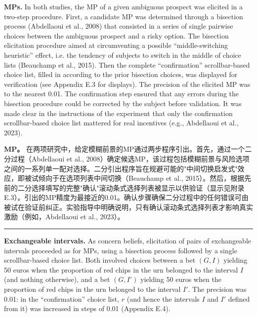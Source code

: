 \documentclass[12pt,a4paper]{article}
\newenvironment{original}
  {\par\vspace{0.5em}\noindent\color{black}\ignorespaces}
  {\par\vspace{0.3em}}
\newenvironment{translation}
  {\par\noindent\color{transblue}\ignorespaces}
  {\par\vspace{0.8em}\hrule\vspace{0.5em}}
\begin{document}
\begin{original}
\textbf{MPs.} In both studies, the MP of a given ambiguous prospect was elicited in a two-step procedure. First, a candidate MP was determined through a bisection process (Abdellaoui et al., 2008) that consisted in a series of single pairwise choices between the ambiguous prospect and a risky option. The bisection elicitation procedure aimed at circumventing a possible ``middle-switching heuristic'' effect, i.e. the tendency of subjects to switch in the middle of choice lists (Beauchamp et al., 2015). Then the complete ``confirmation'' scrollbar-based choice list, filled in according to the prior bisection choices, was displayed for verification (see Appendix E.3 for displays). The precision of the elicited MP was to the nearest 0.01. The confirmation step ensured that any errors during the bisection procedure could be corrected by the subject before validation. It was made clear in the instructions of the experiment that only the confirmation scrollbar-based choice list mattered for real incentives (e.g., Abdellaoui et al., 2023).
\end{original}

\begin{translation}
\textbf{MP。} 在两项研究中，给定模糊前景的MP通过两步程序引出。首先，通过一个二分过程（Abdellaoui et al., 2008）确定候选MP，该过程包括模糊前景与风险选项之间的一系列单一配对选择。二分引出程序旨在规避可能的"中间切换启发式"效应，即被试倾向于在选项列表中间切换（Beauchamp et al., 2015）。然后，根据先前的二分选择填写的完整"确认"滚动条式选择列表被显示以供验证（显示见附录E.3）。引出的MP精度为最接近的0.01。确认步骤确保二分过程中的任何错误可由被试在验证前纠正。实验指导中明确说明，只有确认滚动条式选择列表才影响真实激励（例如，Abdellaoui et al., 2023）。
\end{translation}

\begin{original}
\textbf{Exchangeable intervals.} As concern beliefs, elicitation of pairs of exchangeable intervals proceeded as for MPs, using a bisection process followed by a single scrollbar-based choice list. Both involved choices between a bet $(G, I)$ yielding 50 euros when the proportion of red chips in the urn belonged to the interval $I$ (and nothing otherwise), and a bet $(G, I')$ yielding 50 euros when the proportion of red chips in the urn belonged to the interval $I'$. The precision was 0.01: in the ``confirmation'' choice list, $r$ (and hence the intervals $I$ and $I'$ defined from it) was increased in steps of 0.01 (Appendix E.4).
\end{original}
\end{document}
